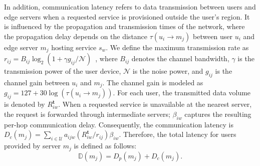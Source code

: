 \documentclass[10pt, conference, letterpaper]{IEEEtran}
\newenvironment{revision}{\begingroup\color{blue}}{\endgroup}
\newenvironment{revision}{\begingroup}{\endgroup}
\begin{document}
\begin{revision}
In addition, communication latency refers to data transmission between users and edge servers when a requested service is provisioned outside the user's region. It is influenced by the propagation and transmission times of the network, where the propagation delay depends on the distance $\tau(u_i\rightarrow m_j)$ between user $u_i$ and edge server $m_j$ hosting service $s_w$. We define the maximum transmission rate as $r_{ij}=B_{ij}\log_2\!\left(1+\gamma g_{ij}/\mathcal{N}\right)$~\cite{b28,b31,b32}, where $B_{ij}$ denotes the channel bandwidth, $\gamma$ is the transmission power of the user device, $\mathcal{N}$ is the noise power, and $g_{ij}$ is the channel gain between $u_i$ and $m_j$. The channel gain is modeled as $g_{ij}=127+30\log\!\left(\tau(u_i\rightarrow m_j)\right)$. For each user, the transmitted data volume is denoted by $R^{\textbf{t}}_{iw}$. When a requested service is unavailable at the nearest server, the request is forwarded through intermediate servers; $\beta_{iw}$ captures the resulting per-hop communication delay. Consequently, the communication latency is $D_c(m_j)=\sum_{i\in\mathcal{U}}a_{ijw}(R^{\textbf{t}}_{iw}/r_{ij})\beta_{iw}$.
\end{revision}
Therefore, the total latency for users provided by server $m_j$ is defined as follows: 
\begin{equation}
	\mathbb{D}(m_j) = D_{p}(m_j) + D_{c}(m_j).
	\label{eq2}
\end{equation}
\end{document}
